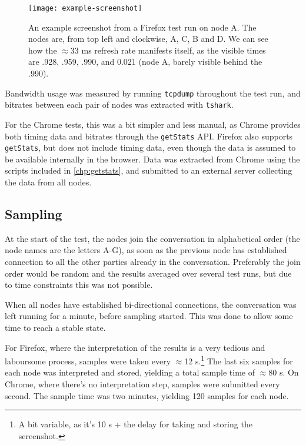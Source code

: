 \begin{figure}
    \centering
    \texttt{[image: example-screenshot]}
    \caption{An example screenshot from a Firefox test run on node A. The nodes are, from top left and clockwise, A, C, B and D. We can see how the $\approx$33 ms refresh rate manifests itself, as the visible times are .928, .959, .990, and 0.021 (node A, barely visible behind the .990).}
    \label{fig:example-screenshot}
\end{figure}

Bandwidth usage was measured by running \texttt{tcpdump} throughout the test run, and bitrates between each pair of nodes was extracted with \texttt{tshark}.

For the Chrome tests, this was a bit simpler and less manual, as Chrome provides both timing data and bitrates through the \texttt{getStats} API. Firefox also supports \texttt{getStats}, but does not include timing data, even though the data is assumed to be available internally in the browser. Data was extracted from Chrome using the scripts included in \autoref{chp:getstats}, and submitted to an external server collecting the data from all nodes.


\subsection{Sampling}

At the start of the test, the nodes join the conversation in alphabetical order (the node names are the letters A-G), as soon as the previous node has established connection to all the other parties already in the conversation. Preferably the join order would be random and the results averaged over several test runs, but due to time constraints this was not possible.

When all nodes have established bi-directional connections, the conversation was left running for a minute, before sampling started. This was done to allow some time to reach a stable state.

For Firefox, where the interpretation of the results is a very tedious and laboursome process, samples were taken every $\approx$12 s.\footnote{A bit variable, as it's 10 s + the delay for taking and storing the screenshot.} The last six samples for each node was interpreted and stored, yielding a total sample time of $\approx$80 s. On Chrome, where there's no interpretation step, samples were submitted every second. The sample time was two minutes, yielding 120 samples for each node.

